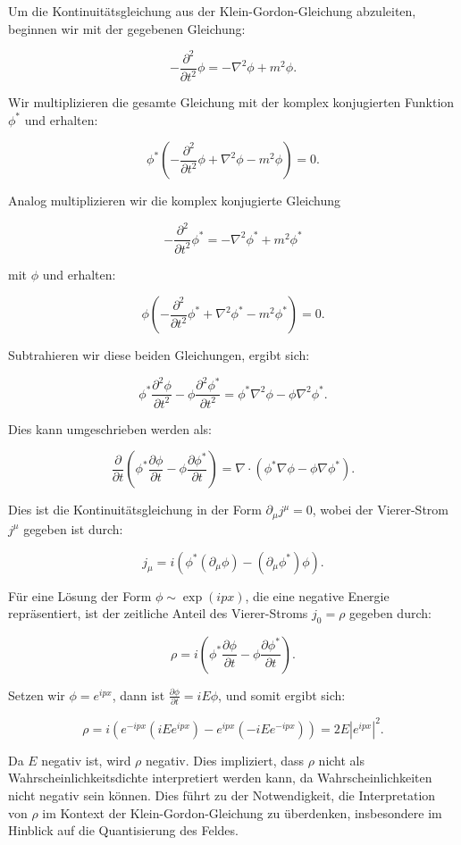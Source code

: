 Um die Kontinuitätsgleichung aus der Klein-Gordon-Gleichung abzuleiten, beginnen wir mit der gegebenen Gleichung:

\[
-\frac{\partial^2}{\partial t^2} \phi = -\nabla^2 \phi + m^2 \phi.
\]

Wir multiplizieren die gesamte Gleichung mit der komplex konjugierten Funktion \(\phi^*\) und erhalten:

\[
\phi^* \left(-\frac{\partial^2}{\partial t^2} \phi + \nabla^2 \phi - m^2 \phi \right) = 0.
\]

Analog multiplizieren wir die komplex konjugierte Gleichung

\[
-\frac{\partial^2}{\partial t^2} \phi^* = -\nabla^2 \phi^* + m^2 \phi^*
\]

mit \(\phi\) und erhalten:

\[
\phi \left(-\frac{\partial^2}{\partial t^2} \phi^* + \nabla^2 \phi^* - m^2 \phi^* \right) = 0.
\]

Subtrahieren wir diese beiden Gleichungen, ergibt sich:

\[
\phi^* \frac{\partial^2 \phi}{\partial t^2} - \phi \frac{\partial^2 \phi^*}{\partial t^2} = \phi^* \nabla^2 \phi - \phi \nabla^2 \phi^*.
\]

Dies kann umgeschrieben werden als:

\[
\frac{\partial}{\partial t} \left(\phi^* \frac{\partial \phi}{\partial t} - \phi \frac{\partial \phi^*}{\partial t}\right) = \nabla \cdot \left(\phi^* \nabla \phi - \phi \nabla \phi^*\right).
\]

Dies ist die Kontinuitätsgleichung in der Form \(\partial_\mu j^\mu = 0\), wobei der Vierer-Strom \(j^\mu\) gegeben ist durch:

\[
j_\mu = i\left(\phi^* \left(\partial_\mu \phi\right) - \left(\partial_\mu \phi^*\right) \phi\right).
\]

Für eine Lösung der Form \(\phi \sim \exp(i p x)\), die eine negative Energie repräsentiert, ist der zeitliche Anteil des Vierer-Stroms \(j_0 = \rho\) gegeben durch:

\[
\rho = i\left(\phi^* \frac{\partial \phi}{\partial t} - \phi \frac{\partial \phi^*}{\partial t}\right).
\]

Setzen wir \(\phi = e^{i p x}\), dann ist \(\frac{\partial \phi}{\partial t} = i E \phi\), und somit ergibt sich:

\[
\rho = i\left(e^{-i p x} (i E e^{i p x}) - e^{i p x} (-i E e^{-i p x})\right) = 2 E |e^{i p x}|^2.
\]

Da \(E\) negativ ist, wird \(\rho\) negativ. Dies impliziert, dass \(\rho\) nicht als Wahrscheinlichkeitsdichte interpretiert werden kann, da Wahrscheinlichkeiten nicht negativ sein können. Dies führt zu der Notwendigkeit, die Interpretation von \(\rho\) im Kontext der Klein-Gordon-Gleichung zu überdenken, insbesondere im Hinblick auf die Quantisierung des Feldes.